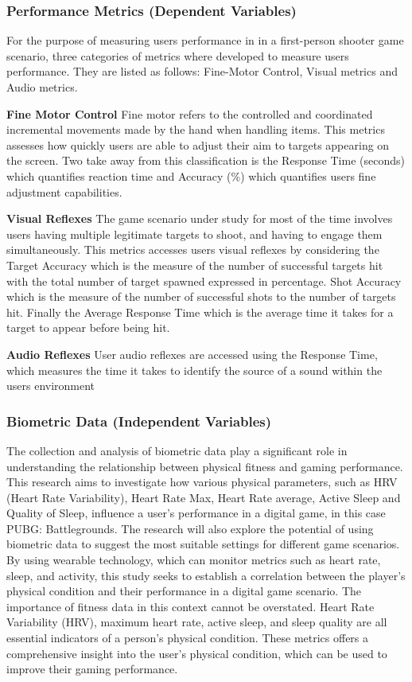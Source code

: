\subsubsection{Performance Metrics (Dependent Variables)}
For the purpose of measuring users performance in in a first-person shooter game scenario, three categories of metrics where
developed to measure users performance. They are listed as follows: Fine-Motor Control, Visual metrics and Audio metrics.

\textbf{Fine Motor Control}  Fine motor refers to the controlled and coordinated incremental movements made by the hand
when handling items. This metrics assesses how quickly users are able to adjust their aim to targets appearing on the screen.
Two take away from this classification is the Response Time (seconds) which quantifies reaction time and Accuracy (\%) which
quantifies users fine adjustment capabilities.

\textbf{Visual Reflexes} The game scenario under study for most of the time involves users having multiple legitimate targets
to shoot, and having to engage them simultaneously. This metrics accesses users visual reflexes by considering the Target
Accuracy which is the measure of the number of successful targets hit with the total number of target spawned expressed in
percentage. Shot Accuracy which is the measure of the number of successful shots to the number of targets hit. Finally the
Average Response Time which is the average time it takes for a target to appear before being hit.

\textbf{Audio Reflexes} User audio reflexes are accessed using the Response Time, which measures the time it takes to
identify the source of a sound within the users environment

\subsubsection{Biometric Data (Independent Variables)}
The collection and analysis of biometric data play a significant role in understanding the relationship between physical fitness and
gaming performance. This research aims to investigate how various physical parameters, such as HRV (Heart Rate Variability), Heart
Rate Max, Heart Rate average, Active Sleep and Quality of Sleep, influence a user's performance in a digital game, in this case
PUBG: Battlegrounds. The  research will also explore the potential of using biometric data to suggest the most suitable settings for
different game scenarios. By using wearable technology, which can monitor metrics such as heart rate, sleep, and activity, this study
seeks to establish a correlation between the player's physical condition and their performance in a digital game scenario. The
importance of fitness data in this context cannot be overstated. Heart Rate Variability (HRV), maximum heart rate, active sleep, and
sleep quality are all essential indicators of a person's physical condition. These metrics offers a comprehensive insight into the
user's physical condition, which can be used to improve their gaming performance.

